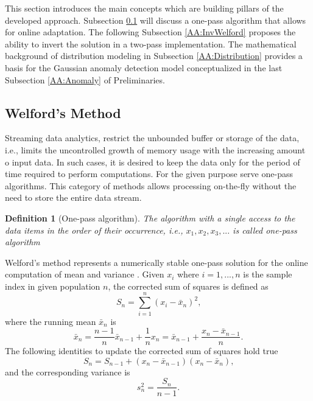This section introduces the main concepts which are building pillars of the developed approach. Subsection \ref{AA:Welford} will discuss a one-pass algorithm that allows for online adaptation. The following Subsection \ref{AA:InvWelford} proposes the ability to invert the solution in a two-pass implementation. The mathematical background of distribution modeling in Subsection \ref{AA:Distribution} provides a basis for the Gaussian anomaly detection model conceptualized in the last Subsection \ref{AA:Anomaly} of Preliminaries.

\subsection{Welford's Method}\label{AA:Welford}
Streaming data analytics, restrict the unbounded buffer or storage of the data, i.e., limits the uncontrolled growth of memory usage with the increasing amount o input data. In such cases, it is desired to keep the data only for the period of time required to perform computations. For the given purpose serve one-pass algorithms. This category of methods allows processing on-the-fly without the need to store the entire data stream. 
\newtheorem{definition}{Definition}[section]
\begin{definition}[One-pass algorithm]
The algorithm with a single access to the data items in the order of their occurrence, i.e., \(x_1,x_2,x_3,...\) is called one-pass algorithm \cite{Schw09}
\end{definition}

Welford's method represents a numerically stable one-pass solution for the online computation of mean and variance \cite{Wel62}. 
Given \(x_i\) where \(i=1,...,n\) is the sample index in given population  \(n\), the corrected sum of squares is defined as
\begin{equation}
S_n = \sum_{i=1}^n (x_i - \bar x_n)^2\text{,}\label{eq:sumsquares}
\end{equation}
where the running mean \(\bar x_n\) is
\begin{equation}
\bar x_n = \frac{n-1}{n} \bar x_{n-1} + \frac{1}{n}x_n = \bar x_{n-1} + \frac{x_n - \bar x_{n-1}}{n}\text{.}\label{eq:runmean}
\end{equation}
The following identities to update the corrected sum of squares hold true
\begin{equation}
S_n = S_{n-1} + (x_n - \bar x_{n-1})(x_n - \bar x_n)\text{,}\label{eq:upsumsquares}
\end{equation}
and the corresponding variance is
\begin{equation}
s^2_n = \frac{S_{n}}{n-1}\text{.}\label{eq:runvar}
\end{equation}

